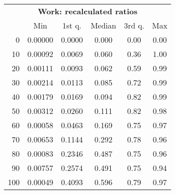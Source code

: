 \begin{tabular}{r|ccccc}
  \multicolumn{6}{c}{{\bf Work: recalculated ratios}} \\
  & Min & 1st q. & Median & 3rd q. & Max \\ \hline\hline
  0 & 0.00000 & 0.0000 & 0.000 & 0.00 & 0.00
\\ 10 & 0.00092 & 0.0069 & 0.060 & 0.36 & 1.00
\\ 20 & 0.00111 & 0.0093 & 0.062 & 0.59 & 0.99
\\ 30 & 0.00214 & 0.0113 & 0.085 & 0.72 & 0.99
\\ 40 & 0.00179 & 0.0169 & 0.094 & 0.82 & 0.99
\\ 50 & 0.00312 & 0.0260 & 0.111 & 0.82 & 0.98
\\ 60 & 0.00058 & 0.0463 & 0.169 & 0.75 & 0.97
\\ 70 & 0.00653 & 0.1144 & 0.292 & 0.78 & 0.96
\\ 80 & 0.00083 & 0.2346 & 0.487 & 0.75 & 0.96
\\ 90 & 0.00757 & 0.2574 & 0.491 & 0.75 & 0.94
\\ 100 & 0.00049 & 0.4093 & 0.596 & 0.79 & 0.97
\end{tabular}
